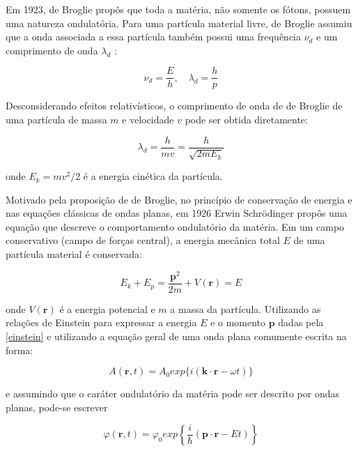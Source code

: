 	Em 1923, de Broglie propôs que toda a matéria, não somente os fótons, possuem uma natureza ondulatória. Para uma partícula material livre, de Broglie assumiu que a onda associada a essa partícula também possui uma frequência $\nu_d$ e um comprimento de onda $\lambda_d$ \cite{broglie1923waves}: 
	
	\begin{equation} 
		\nu_d = \frac{E}{h}, \quad \lambda_d = \frac{h}{p}
		\label{einstein}
	\end{equation}
	
	Desconsiderando efeitos relativísticos, o comprimento de onda de de Broglie de uma partícula de massa $m$ e velocidade $v$ pode ser obtida diretamente:
	
	\begin{equation}
		\lambda_d = \frac{h}{mv} = \frac{h}{\sqrt{2mE_k}}
	\end{equation}
	
	onde $E_k = mv^2/2$ é a energia cinética da partícula. 
	
	Motivado pela proposição de de Broglie, no princípio de conservação de energia e nas equações clássicas de ondas planas, em 1926 Erwin Schrödinger propôs uma equação que descreve o comportamento ondulatório da matéria. Em um campo conservativo (campo de forças central), a energia mecânica total $E$ de uma partícula material é conservada:
	
	\begin{equation}
		E_k + E_p = \frac{\textbf{p}^2}{2m} + V(\textbf{r}) = E
		\label{e_schrodinger}
	\end{equation}
	
	onde $V(\textbf{r})$ é a energia potencial e $m$ a massa da partícula. Utilizando as relações de Einstein para expressar a energia $E$ e o momento $\textbf{p}$ dadas pela \autoref{einstein} e utilizando a equação geral de uma onda plana comumente escrita na forma:
	
	\begin{equation}
		A(\textbf{r}, t) = A_0 exp\{i(\textbf{k} \cdot \textbf{r} - \omega t)\}
	\end{equation}
	
	e assumindo que o caráter ondulatório da matéria pode ser descrito por ondas planas, pode-se escrever
	
	\begin{equation}
		\varphi (\textbf{r}, t) = \varphi_0 exp \left\{ \frac{i}{\hbar} (\textbf{p} \cdot \textbf{r} - Et) \right\}
	\end{equation}
	
